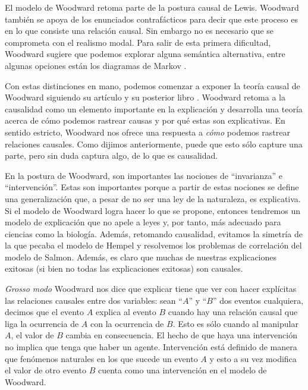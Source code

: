 {El modelo de Woodward retoma parte de la postura causal de Lewis. Woodward también se apoya de los enunciados contrafácticos para decir que este proceso es en lo que consiste una relación causal. Sin embargo no es necesario que se comprometa con el realismo modal. Para salir de esta primera dificultad, Woodward sugiere que podemos explorar alguna semántica alternativa, entre algunas opciones están los diagramas de Markov \cite{pittphilsci18628}.

Con estas distinciones en mano, podemos comenzar a exponer la teoría causal de Woodward siguiendo su artículo \citeyear{Woodward2000} y su posterior libro \citeyear{Woodward2003}.  Woodward  retoma a la causalidad como un elemento importante en la explicación y desarrolla una teoría acerca de cómo podemos rastrear causas y por qué estas son explicativas. En sentido estricto, Woodward nos ofrece una respuesta a \textit{cómo} podemos rastrear relaciones causales. Como dijimos anteriormente, puede que esto sólo capture una parte, pero sin duda captura algo, de lo que es causalidad.

En la postura de Woodward, son importantes las nociones de ``invarianza'' e ``intervención''. Estas son importantes porque a partir de estas nociones se define una generalización que, a pesar de no ser una ley de la naturaleza, es explicativa. Si el modelo de Woodward logra hacer lo que se propone, entonces tendremos un modelo de explicación que no apele a leyes y, por tanto, más adecuado para ciencias como la biología. Además, retomando causalidad, evitamos la simetría de la que pecaba el modelo de Hempel y resolvemos los problemas de correlación del modelo de Salmon. Además, es claro que muchas de nuestras explicaciones exitosas (si bien no todas las explicaciones exitosas) son causales.

\textit{Grosso modo} Woodward nos dice que explicar tiene que ver con hacer explícitas las relaciones causales entre dos variables: sean ``$A$'' y ``$B$'' dos eventos cualquiera, decimos que el evento $A$ explica al evento $B$ cuando hay una relación causal que liga la ocurrencia de $A$ con la ocurrencia de $B$. Esto es sólo cuando al manipular $A$, el valor de $B$ cambia en consecuencia. El hecho de que haya una intervención no implica que tenga que haber un agente. Intervención está definido de manera que fenómenos naturales en los que sucede un evento $A$ y esto a su vez modifica el valor de otro evento $B$ cuenta como una intervención en el modelo de Woodward.

}
